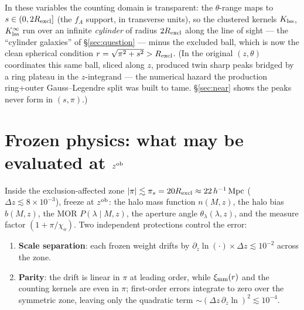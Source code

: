 \documentclass[a4paper, 11pt]{article}
\newcommand{\zob}{z^{\rm ob}}
\newcommand{\ximm}{\xi_{\rm mm}}
\newcommand{\hMpc}{h^{-1}\,\mathrm{Mpc}}
\newcommand{\Rex}{R_{\rm excl}}
\newcommand{\rp}{s}
\newcommand{\Klss}{K_{\rm lss}}
\newcommand{\KlssInf}{K_{\rm lss}^{\infty}}
\begin{document}
In these variables the counting domain is transparent: the
$\theta$-range maps to $\rp\in(0,2\Rex]$ (the $f_A$ support, in
transverse units), so the clustered kernels $\Klss$, $\KlssInf$ run
over an infinite \emph{cylinder} of radius $2\Rex$ along the line
of sight --- the ``cylinder galaxies'' of \S\ref{sec:question}
--- minus the excluded ball, which is now the clean spherical
condition $r=\sqrt{\pi^2+\rp^2}>\Rex$. (In the original
$(z,\theta)$ coordinates this same ball, sliced along $z$,
produced twin sharp peaks bridged by a ring plateau in the
$z$-integrand --- the numerical hazard the production ring+outer
Gauss--Legendre split was built to tame. \S\ref{sec:near} shows
the peaks never form in $(\rp,\pi)$.)

\section{Frozen physics: what may be evaluated at \texorpdfstring{$\zob$}{zob}}
\label{sec:frozen}

Inside the exclusion-affected zone $|\pi|\lesssim \pi_s = 20\Rex
\approx 22\,\hMpc$ ($\Delta z\lesssim 8\times 10^{-3}$), freeze
at $\zob$: the halo mass function $n(M,z)$, the halo bias
$b(M,z)$, the MOR $P(\lambda\mid M,z)$, the aperture angle
$\theta_\lambda(\lambda,z)$, and the measure factor
$(1+\pi/\chi_o)$. Two independent protections control the error:
\begin{enumerate}
\item \textbf{Scale separation}: each frozen weight drifts by
      $\partial_z\ln(\cdot)\times\Delta z \lesssim 10^{-2}$ across
      the zone.
\item \textbf{Parity}: the drift is linear in $\pi$ at leading
      order, while $\ximm(r)$ and the counting kernels are even in
      $\pi$; first-order errors integrate to zero over the
      symmetric zone, leaving only the quadratic term
      $\sim(\Delta z\,\partial_z\ln)^2\lesssim 10^{-4}$.
\end{enumerate}
\end{document}

